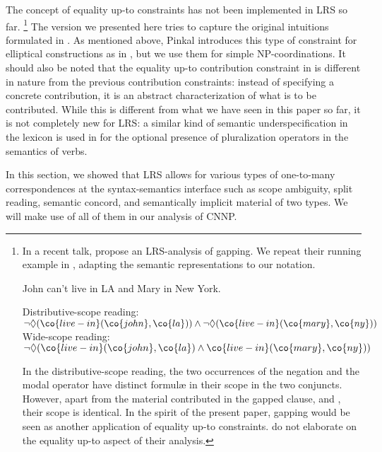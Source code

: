 \documentclass[output=paper]{langsci/langscibook}
\begin{document}
The concept of equality up-to constraints has not been implemented in LRS so far.%
%
\footnote{In a recent talk, \citet{Park:al:18} propose an LRS-analysis of gapping. We repeat their running example in , adapting the semantic representations to our notation.

\ea \label{gapping}
John can't live in LA and Mary in New York.
\begin{xlist}
\ex Distributive-scope reading:
$\lnot \Diamond (\co{live-in}(\co{john},\co{la}))
\land \lnot \Diamond (\co{live-in}(\co{mary},\co{ny}))$
\ex Wide-scope reading: 
$\lnot \Diamond (\co{live-in}(\co{john},\co{la}) 
\land \co{live-in}(\co{mary},\co{ny}))$
\end{xlist}
\z 

In the distributive-scope reading, the two occurrences of the negation and the modal operator have distinct formul\ae{} in their scope in the two conjuncts. However, apart from the material contributed in the gapped clause,  and , their scope is identical. In the spirit of the present paper, gapping would be seen as another application of equality up-to constraints. \citet{Park:al:18} do not elaborate on the equality up-to aspect of their analysis.

}
The version we presented here tries to capture the original intuitions formulated in \citet{Pinkal:99}. 
As mentioned above, Pinkal introduces this type of constraint for elliptical constructions as in , but we use them for simple NP-coordinations. 
It should also be noted that the equality up-to contribution constraint in  is different in nature from the previous contribution constraints:
instead of specifying a concrete contribution, it is an abstract characterization of what is to be contributed. 
While this is different from what we have seen in this paper so far, it is not completely new for LRS: a similar kind of semantic underspecification in the lexicon is used 
in \citet{Lahm:18} for the optional presence of pluralization operators in the semantics of verbs. 

\bigskip%
In this section, we showed that LRS allows for various types of one-to-many correspondences at the syntax-semantics interface such as 
scope ambiguity, split reading, semantic concord, and semantically implicit material of two types.
We will make use of all of them in our analysis of CNNP.

\end{document}
